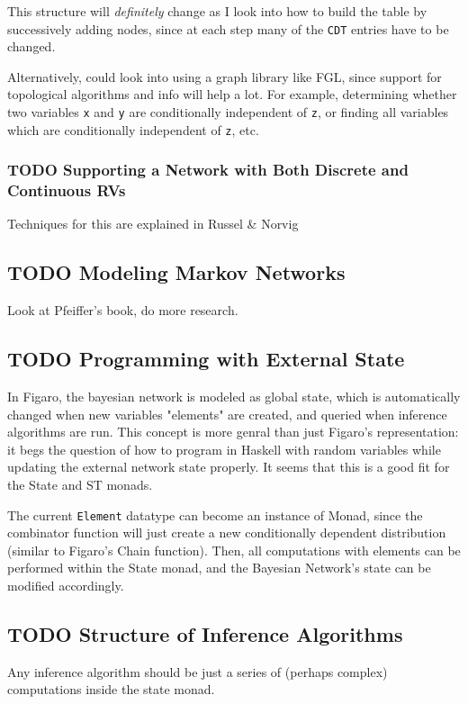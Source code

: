 \documentclass[11pt]{article}
\begin{document}
This structure will \emph{definitely} change as I look into how to
build the table by successively adding nodes, since at each step
many of the \texttt{CDT} entries have to be changed. 

Alternatively, could look into using a graph library like FGL,
since support for topological algorithms and info will help a
lot. For example, determining whether two variables \texttt{x} and \texttt{y}
are conditionally independent of \texttt{z}, or finding all variables
which are conditionally independent of \texttt{z}, etc.

\subsubsection{{\bfseries\sffamily TODO} Supporting a Network with Both Discrete and Continuous RVs}
\label{sec-2-2-3}
Techniques for this are explained in Russel \& Norvig

\subsection{{\bfseries\sffamily TODO} Modeling Markov Networks}
\label{sec-2-3}
Look at Pfeiffer's book, do more research.

\subsection{{\bfseries\sffamily TODO} Programming with External State}
\label{sec-2-4}
In Figaro, the bayesian network is modeled as global state, which 
is automatically changed when new variables "elements" are created,
and queried when inference algorithms are run. This concept is more
genral than just Figaro's representation: it begs the question of
how to program in Haskell with random variables while updating
the external network state properly. It seems that this is a good
fit for the State and ST monads.

The current \texttt{Element} datatype can become an instance of Monad,
since the combinator function will just create a new conditionally
dependent distribution (similar to Figaro's Chain function). Then,
all computations with elements can be performed within the State monad,
and the Bayesian Network's state can be modified accordingly.

\subsection{{\bfseries\sffamily TODO} Structure of Inference Algorithms}
\label{sec-2-5}
Any inference algorithm should be just a series of (perhaps complex) computations
inside the state monad.
\end{document}
